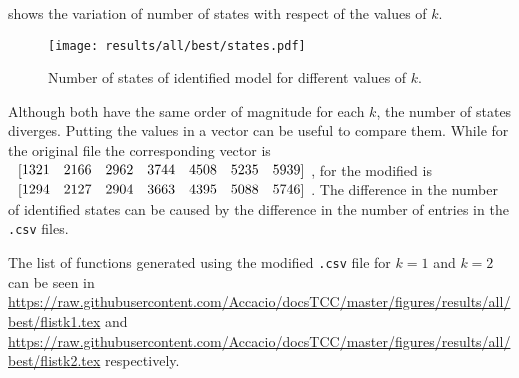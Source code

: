 shows the variation of number of states with respect of the values of $k$.
\begin{figure}[H]
  \centering
  \texttt{[image: results/all/best/states.pdf]}
  \caption{Number of states of identified model for different values of $k$.}
    \label{fig:statesIdentBest}
\end{figure}
Although both  have the same order of magnitude for
each $k$, the number of states diverges. Putting the values in a vector can be
useful to
compare them. While for the original file the corresponding vector is
$\colvec{1321& 2166& 2962& 3744& 4508& 5235& 5939}$, for the modified is 
$\colvec{1294& 2127& 2904& 3663& 4395& 5088& 5746}$.
The difference in the number of identified states can be caused by the difference in the number of entries
in the \verb|.csv| files.

 The list of \ffunction{} functions generated using the modified \verb|.csv| file
for $k=1$ and \mbox{$k=2$}
can be seen in  
\url{https://raw.githubusercontent.com/Accacio/docsTCC/master/figures/results/all/best/flistk1.tex}
and
\url{https://raw.githubusercontent.com/Accacio/docsTCC/master/figures/results/all/best/flistk2.tex}
respectively.

